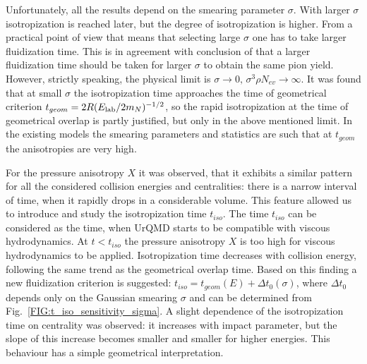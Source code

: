 Unfortunately, all the results depend on the smearing parameter $\sigma$. With
larger $\sigma$ isotropization is reached later, but the degree of
isotropization is higher. From a practical point of view that means that
selecting large $\sigma$ one has to take larger fluidization time. This is in
agreement with conclusion of \cite{Petersen:2010zt} that a larger fluidization
time should be taken for larger $\sigma$ to obtain the same pion yield.
However, strictly speaking, the physical limit is $\sigma \to 0, \, \sigma^3
\rho N_{ev} \to \infty$. It was found that at small $\sigma$ the isotropization
time approaches the time of geometrical criterion $t_{geom} = 2R
(E_\mathrm{lab}/2m_N)^{-1/2}$, so the rapid isotropization at the time of geometrical
overlap is partly justified, but only in the above mentioned limit. In the
existing models the smearing parameters and statistics are such that at
$t_{geom}$ the anisotropies are very high.

For the pressure anisotropy $X$ it was observed, that it exhibits a similar
pattern for all the considered collision energies and centralities: there is a
narrow interval of time, when it rapidly drops in a considerable volume. This
feature allowed us to introduce and study the isotropization time $t_{iso}$.
The time $t_{iso}$ can be considered as the time, when UrQMD starts to be
compatible with viscous hydrodynamics. At $t < t_{iso}$ the pressure anisotropy
$X$ is too high for viscous hydrodynamics to be applied. Isotropization time
decreases with collision energy, following the same trend as the geometrical
overlap time.  Based on this finding a new fluidization criterion is suggested:
$t_{iso} = t_{geom}(E) + \Delta t_0 (\sigma)$, where $\Delta t_0$ depends only
on the Gaussian smearing $\sigma$ and can be determined from
Fig.~\ref{FIG:t_iso_sensitivity_sigma}. A slight dependence of the isotropization
time on centrality was observed: it increases with impact parameter, but the
slope of this increase becomes smaller and smaller for higher energies. This
behaviour has a simple geometrical interpretation.
